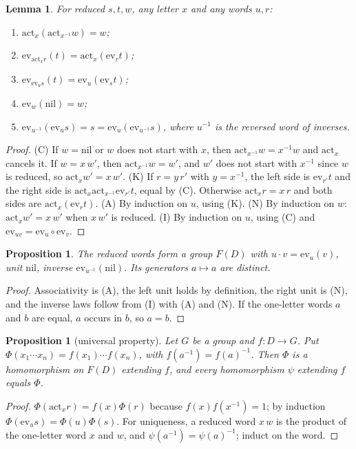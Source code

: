 \documentclass[11pt]{amsart}
\newtheorem{proposition}[theorem]{Proposition}
\newtheorem{lemma}[theorem]{Lemma}
\theoremstyle{definition}
\theoremstyle{remark}
\newcommand{\act}{\mathrm{act}}
\newcommand{\ev}{\mathrm{ev}}
\begin{document}
\begin{lemma}\label{lem:words}
For reduced $s,t,w$, any letter $x$ and any words $u,r$:
\begin{enumerate}
\item[(C)] $\act_x(\act_{x^{-1}}w)=w$;
\item[(K)] $\ev_{\act_x r}(t)=\act_x(\ev_r t)$;
\item[(A)] $\ev_{\ev_u s}(t)=\ev_u(\ev_s t)$;
\item[(N)] $\ev_w(\mathrm{nil})=w$;
\item[(I)] $\ev_{u^{-1}}(\ev_u s)=s=\ev_u(\ev_{u^{-1}} s)$, where $u^{-1}$ is
the reversed word of inverses.
\end{enumerate}
\end{lemma}
\begin{proof}
(C) If $w=\mathrm{nil}$ or $w$ does not start with $x$, then
$\act_{x^{-1}}w=x^{-1}w$ and $\act_x$ cancels it. If $w=x\,w'$, then
$\act_{x^{-1}}w=w'$, and $w'$ does not start with $x^{-1}$ since $w$ is
reduced, so $\act_x w'=x\,w'$.
(K) If $r=y\,r'$ with $y=x^{-1}$, the left side is $\ev_{r'}t$ and the
right side is $\act_x\act_{x^{-1}}\ev_{r'}t$, equal by (C). Otherwise
$\act_x r=x\,r$ and both sides are $\act_x(\ev_r t)$.
(A) By induction on $u$, using (K).
(N) By induction on $w$: $\act_x w'=x\,w'$ when $x\,w'$ is reduced.
(I) By induction on $u$, using (C) and $\ev_{u v}=\ev_u\circ\ev_v$.
\end{proof}

\begin{proposition}
The reduced words form a group $F(D)$ with $u\cdot v=\ev_u(v)$, unit
$\mathrm{nil}$, inverse $\ev_{u^{-1}}(\mathrm{nil})$. Its generators
$a\mapsto a$ are distinct.
\end{proposition}
\begin{proof}
Associativity is (A), the left unit holds by definition, the right unit
is (N), and the inverse laws follow from (I) with (A) and (N). If the
one-letter words $a$ and $b$ are equal, $a$ occurs in $b$, so $a=b$.
\end{proof}

\begin{proposition}[universal property]\label{prop:up-words}
Let $G$ be a group and $f:D\to G$. Put $\Phi(x_1\cdots x_n)=f(x_1)\cdots
f(x_n)$, with $f(a^{-1})=f(a)^{-1}$. Then $\Phi$ is a homomorphism on
$F(D)$ extending $f$, and every homomorphism $\psi$ extending $f$ equals
$\Phi$.
\end{proposition}
\begin{proof}
$\Phi(\act_x r)=f(x)\Phi(r)$ because $f(x)f(x^{-1})=1$; by induction
$\Phi(\ev_u s)=\Phi(u)\Phi(s)$. For uniqueness, a reduced word $x\,w$ is
the product of the one-letter word $x$ and $w$, and
$\psi(a^{-1})=\psi(a)^{-1}$; induct on the word.
\end{proof}
\end{document}
